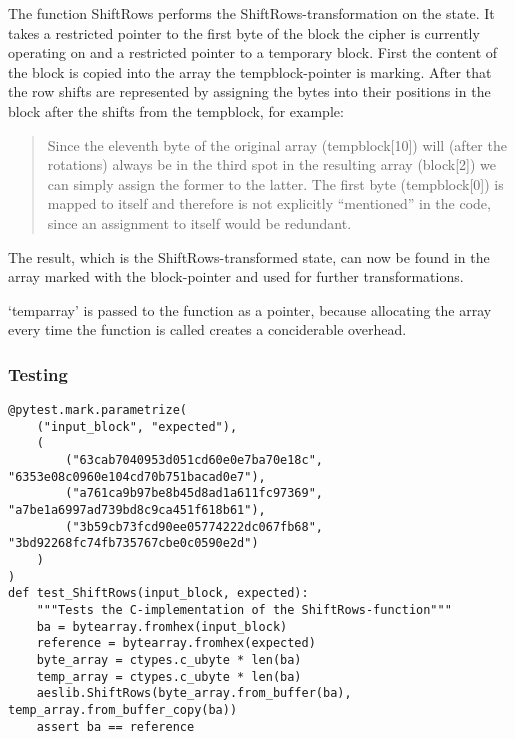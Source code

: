 The function ShiftRows performs the ShiftRows-transformation on the
state. It takes a restricted pointer to the first byte of the block the
cipher is currently operating on and a restricted pointer to a temporary
block. First the content of the block is copied into the array the
tempblock-pointer is marking. After that the row shifts are represented
by assigning the bytes into their positions in the block after the
shifts from the tempblock, for example:

\begin{quote}
Since the eleventh byte of the original array (tempblock{[}10{]}) will
(after the rotations) always be in the third spot in the resulting array
(block{[}2{]}) we can simply assign the former to the latter. The first
byte (tempblock{[}0{]}) is mapped to itself and therefore is not
explicitly ``mentioned'' in the code, since an assignment to itself
would be redundant.
\end{quote}

The result, which is the ShiftRows-transformed state, can now be found
in the array marked with the block-pointer and used for further
transformations.

`temparray' is passed to the function as a pointer, because allocating
the array every time the function is called creates a conciderable
overhead.

\hypertarget{testing-3}{%
\subsubsection{Testing}\label{testing-3}}

\begin{lstlisting}
@pytest.mark.parametrize(
    ("input_block", "expected"),
    (
        ("63cab7040953d051cd60e0e7ba70e18c", "6353e08c0960e104cd70b751bacad0e7"),
        ("a761ca9b97be8b45d8ad1a611fc97369", "a7be1a6997ad739bd8c9ca451f618b61"),
        ("3b59cb73fcd90ee05774222dc067fb68", "3bd92268fc74fb735767cbe0c0590e2d")
    )
)
def test_ShiftRows(input_block, expected):
    """Tests the C-implementation of the ShiftRows-function"""
    ba = bytearray.fromhex(input_block)
    reference = bytearray.fromhex(expected)
    byte_array = ctypes.c_ubyte * len(ba)
    temp_array = ctypes.c_ubyte * len(ba)
    aeslib.ShiftRows(byte_array.from_buffer(ba), temp_array.from_buffer_copy(ba))
    assert ba == reference
\end{lstlisting}

